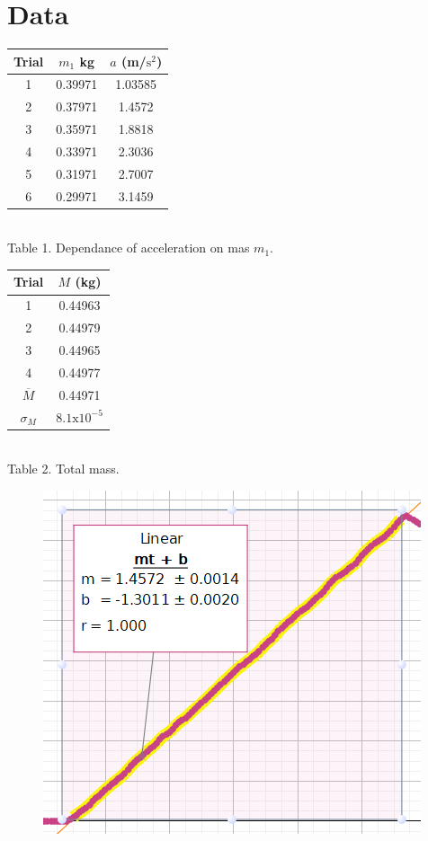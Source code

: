 \documentclass[12pt]{article}
\begin{document}
    \section{Data}
        \begin{center}
            \begin{tabular}{c|cc}
                Trial & \(m_1\) kg & \(a\) (m/\(\mathrm{s}^2\))\\
                \hline
                1 & 0.39971 & 1.03585\\
                2 & 0.37971 & 1.4572\\
                3 & 0.35971 & 1.8818\\
                4 & 0.33971 & 2.3036\\
                5 & 0.31971 & 2.7007\\
                6 & 0.29971 & 3.1459
            \end{tabular}\\
            Table 1. Dependance of acceleration on mas \(m_1\).\\[14pt]
            \begin{tabular}{c|c} 
                Trial & \(M\) (kg)\\
                \hline
                1 & 0.44963\\
                2 & 0.44979\\
                3 & 0.44965\\
                4 & 0.44977\\
                \hline
                \(\overline{M}\) & 0.44971\\
                \(\sigma_M\) & \(8.1\mathrm{x}10^{-5}\)
            \end{tabular}\\
            Table 2. Total mass.
        \begin{figure}[H]
            \centering
            \includegraphics{Velocity vs Time.png}

\end{figure}
\end{center}
\end{document}
